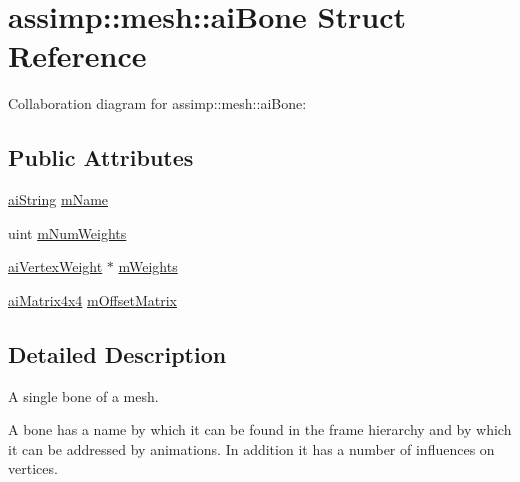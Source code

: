 \hypertarget{structassimp_1_1mesh_1_1ai_bone}{\section{assimp\+:\+:mesh\+:\+:ai\+Bone Struct Reference}
\label{structassimp_1_1mesh_1_1ai_bone}
}


Collaboration diagram for assimp\+:\+:mesh\+:\+:ai\+Bone\+:
\subsection*{Public Attributes}
\begin{DoxyCompactItemize}
\item 
\hyperlink{structassimp_1_1types_1_1ai_string}{ai\+String} \hyperlink{structassimp_1_1mesh_1_1ai_bone_a2cf2e251c682709f1deaef9f863fa94e}{m\+Name}
\item 
uint \hyperlink{structassimp_1_1mesh_1_1ai_bone_a25df69957af6505c3e2e9db0205e209d}{m\+Num\+Weights}
\item 
\hyperlink{structassimp_1_1mesh_1_1ai_vertex_weight}{ai\+Vertex\+Weight} $\ast$ \hyperlink{structassimp_1_1mesh_1_1ai_bone_acb25d504b05606e326b03da7fea4ef8c}{m\+Weights}
\item 
\hyperlink{structai_matrix4x4}{ai\+Matrix4x4} \hyperlink{structassimp_1_1mesh_1_1ai_bone_afacaa1fbf11977a77e72c174874c42be}{m\+Offset\+Matrix}
\end{DoxyCompactItemize}


\subsection{Detailed Description}
A single bone of a mesh.

A bone has a name by which it can be found in the frame hierarchy and by which it can be addressed by animations. In addition it has a number of influences on vertices. 

